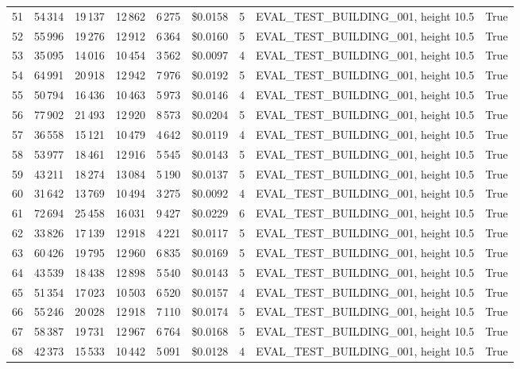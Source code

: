 \documentclass[a4paper,11pt]{article}
\begin{document}
\begin{table}[ht]
\begin{tabular}{r r r r r r r p{3cm} l}
51 & 54\,314 & 19\,137 & 12\,862 & 6\,275 & \$0.0158 & 5 & EVAL\_TEST\_BUILDING\_001, height 10.5 & True \\
52 & 55\,996 & 19\,276 & 12\,912 & 6\,364 & \$0.0160 & 5 & EVAL\_TEST\_BUILDING\_001, height 10.5 & True \\
53 & 35\,095 & 14\,016 & 10\,454 & 3\,562 & \$0.0097 & 4 & EVAL\_TEST\_BUILDING\_001, height 10.5 & True \\
54 & 64\,991 & 20\,918 & 12\,942 & 7\,976 & \$0.0192 & 5 & EVAL\_TEST\_BUILDING\_001, height 10.5 & True \\
55 & 50\,794 & 16\,436 & 10\,463 & 5\,973 & \$0.0146 & 4 & EVAL\_TEST\_BUILDING\_001, height 10.5 & True \\
56 & 77\,902 & 21\,493 & 12\,920 & 8\,573 & \$0.0204 & 5 & EVAL\_TEST\_BUILDING\_001, height 10.5 & True \\
57 & 36\,558 & 15\,121 & 10\,479 & 4\,642 & \$0.0119 & 4 & EVAL\_TEST\_BUILDING\_001, height 10.5 & True \\
58 & 53\,977 & 18\,461 & 12\,916 & 5\,545 & \$0.0143 & 5 & EVAL\_TEST\_BUILDING\_001, height 10.5 & True \\
59 & 43\,211 & 18\,274 & 13\,084 & 5\,190 & \$0.0137 & 5 & EVAL\_TEST\_BUILDING\_001, height 10.5 & True \\
60 & 31\,642 & 13\,769 & 10\,494 & 3\,275 & \$0.0092 & 4 & EVAL\_TEST\_BUILDING\_001, height 10.5 & True \\
61 & 72\,694 & 25\,458 & 16\,031 & 9\,427 & \$0.0229 & 6 & EVAL\_TEST\_BUILDING\_001, height 10.5 & True \\
62 & 33\,826 & 17\,139 & 12\,918 & 4\,221 & \$0.0117 & 5 & EVAL\_TEST\_BUILDING\_001, height 10.5 & True \\
63 & 60\,426 & 19\,795 & 12\,960 & 6\,835 & \$0.0169 & 5 & EVAL\_TEST\_BUILDING\_001, height 10.5 & True \\
64 & 43\,539 & 18\,438 & 12\,898 & 5\,540 & \$0.0143 & 5 & EVAL\_TEST\_BUILDING\_001, height 10.5 & True \\
65 & 51\,354 & 17\,023 & 10\,503 & 6\,520 & \$0.0157 & 4 & EVAL\_TEST\_BUILDING\_001, height 10.5 & True \\
66 & 55\,246 & 20\,028 & 12\,918 & 7\,110 & \$0.0174 & 5 & EVAL\_TEST\_BUILDING\_001, height 10.5 & True \\
67 & 58\,387 & 19\,731 & 12\,967 & 6\,764 & \$0.0168 & 5 & EVAL\_TEST\_BUILDING\_001, height 10.5 & True \\
68 & 42\,373 & 15\,533 & 10\,442 & 5\,091 & \$0.0128 & 4 & EVAL\_TEST\_BUILDING\_001, height 10.5 & True \\

\end{tabular}
\end{table}
\end{document}
